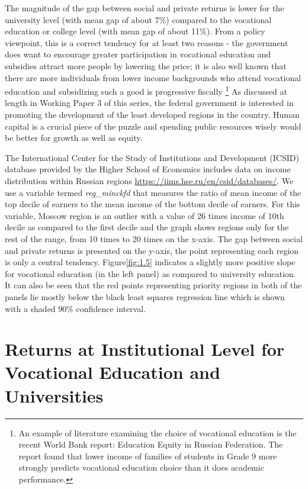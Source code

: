 \documentclass[alpha-refs]{wiley-article-05g}
\begin{document}
The magnitude of the gap between social and private returns is lower for the university level (with mean gap of about 7\%) compared to the vocational education or college level (with mean gap of about 11\%). From a policy viewpoint, this is a correct tendency for at least two reasons - the government does want to encourage greater participation in vocational education and subsidies attract more people by lowering the price; it is also well known that there are more individuals from lower income backgrounds who attend vocational education and subsidizing such a good is progressive fiscally \footnote{An example of literature examining the choice of vocational education is  the recent World Bank report: Education Equity in Russian Federation. The report found that lower income of families of students in Grade 9 more strongly predicts vocational education choice than it does academic performance.} As discussed at length in Working Paper 3 of this series, the federal government is interested in promoting the development of the least developed regions in the country. Human capital is a crucial piece of the puzzle and spending public resources wisely would be better for growth as well as equity.  

The  International Center for the Study of Institutions and Development (ICSID) database provided by the Higher School of Economics includes data on income distribution within Russian regions \url{https://iims.hse.ru/en/csid/databases/}. We use a variable termed \textit{reg\_minckfd} that measures the ratio of mean income of the top decile of earners to the mean income of the bottom decile of earners. For this variable, Moscow region is an outlier with a value of 26 times income of 10th decile as compared to the first decile and the graph shows regions only for the rest of the range, from 10 times to 20 times on the x-axis. The gap between social and private returns is presented on the y-axis, the point representing each region is only a central tendency. Figure\ref{fig:1.5} indicates a slightly more positive slope for vocational education (in the left panel) as compared to university education. It can also be seen that the red points representing priority regions in both of the panels lie mostly below the black least squares regression line which is shown with a shaded 90\% confidence interval.

\vspace{-2em}

\section{Returns at Institutional Level for Vocational Education and Universities} 
\end{document}
